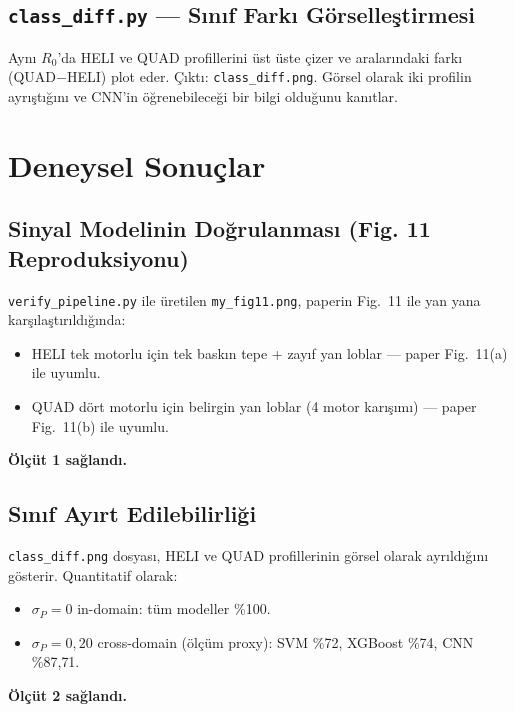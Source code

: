 \documentclass[11pt,a4paper]{article}
\begin{document}
\subsection{\texttt{class\_diff.py} — Sınıf Farkı Görselleştirmesi}
Aynı $R_0$'da HELI ve QUAD profillerini üst üste çizer ve aralarındaki farkı (QUAD$-$HELI)
plot eder. Çıktı: \texttt{class\_diff.png}. Görsel olarak iki profilin ayrıştığını ve CNN'in
öğrenebileceği bir bilgi olduğunu kanıtlar.

\section{Deneysel Sonuçlar}

\subsection{Sinyal Modelinin Doğrulanması (Fig. 11 Reproduksiyonu)}
\texttt{verify\_pipeline.py} ile üretilen \texttt{my\_fig11.png}, paperin Fig.~11 ile yan yana
karşılaştırıldığında:
\begin{itemize}
    \item HELI tek motorlu için tek baskın tepe + zayıf yan loblar — paper Fig.~11(a) ile uyumlu.
    \item QUAD dört motorlu için belirgin yan loblar (4 motor karışımı) — paper Fig.~11(b) ile uyumlu.
\end{itemize}
\textbf{Ölçüt 1 sağlandı.}

\subsection{Sınıf Ayırt Edilebilirliği}
\texttt{class\_diff.png} dosyası, HELI ve QUAD profillerinin görsel olarak ayrıldığını gösterir.
Quantitatif olarak:
\begin{itemize}
    \item $\sigma_P=0$ in-domain: tüm modeller \%100.
    \item $\sigma_P=0{,}20$ cross-domain (ölçüm proxy): SVM \%72, XGBoost \%74, CNN \%87{,}71.
\end{itemize}
\textbf{Ölçüt 2 sağlandı.}
\end{document}

